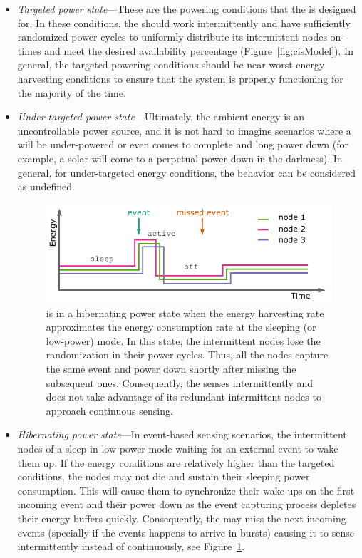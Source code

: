 \begin{itemize}
		\item \textit{Targeted power state}---These are the powering conditions that the \sys is designed for. In these  conditions, the \sys should work intermittently and have sufficiently randomized power cycles to uniformly distribute its intermittent nodes on-times and meet the desired availability percentage (Figure~\ref{fig:cisModel}). In general, the targeted powering conditions should be near worst energy harvesting conditions to ensure that the system is properly functioning for the majority of the time.
		\item \textit{Under-targeted power state}---Ultimately, the ambient energy is an uncontrollable power source, and it is not hard to imagine scenarios where a \sys will be under-powered or even comes to complete and long power down (for example, a solar \sys will come to a perpetual power down in the darkness). In general, for under-targeted energy conditions, the \sys behavior can be considered as undefined.
%
\begin{figure}
		\centering
		\includegraphics[width=\columnwidth]{figures/hibernating_power_state}
		\caption{\fullsys is in a hibernating power state when the energy harvesting rate approximates the energy consumption rate at the sleeping (or low-power) mode. In this state, the intermittent nodes lose the randomization in their power cycles. Thus, all the nodes capture the same event and power down shortly after missing the subsequent ones. Consequently, the \sys senses intermittently and does not take advantage of its redundant intermittent nodes to approach continuous sensing.}
		\label{fig:noRand}
\end{figure} 
%
		\item \label{it:hibernating} \textit{Hibernating power state}---In event-based sensing scenarios, the intermittent nodes of a \sys sleep in low-power mode waiting for an external event to wake them up. If the energy conditions are relatively higher than the targeted conditions, the nodes may not die and sustain their sleeping power consumption. This will cause them to synchronize their wake-ups on the first incoming event and their power down as the event capturing process depletes their energy buffers quickly. Consequently, the \sys may miss the next incoming events (specially if the events happens to arrive in bursts) causing it to sense intermittently instead of continuously, see Figure~\ref{fig:noRand}. 

\end{itemize}
